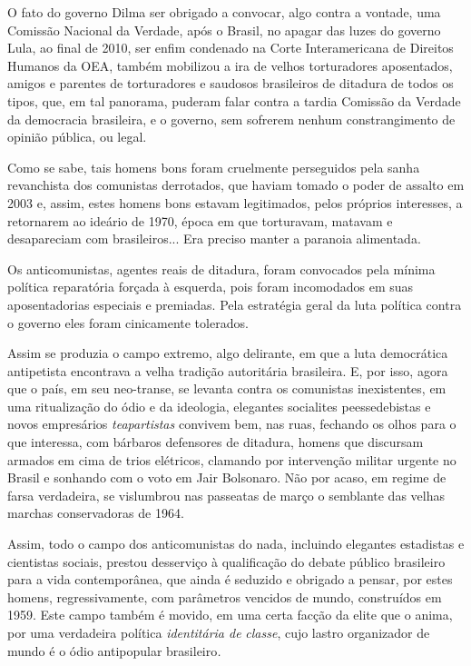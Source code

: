 O fato do governo Dilma ser obrigado a convocar, algo contra a vontade,
uma Comissão Nacional da Verdade, após o Brasil, no apagar das luzes do
governo Lula, ao final de 2010, ser enfim condenado na Corte
Interamericana de Direitos Humanos da OEA, também mobilizou a ira de
velhos torturadores aposentados, amigos e parentes de torturadores e
saudosos brasileiros de ditadura de todos os tipos, que, em tal
panorama, puderam falar contra a tardia Comissão da Verdade da
democracia brasileira, e o governo, sem sofrerem nenhum constrangimento
de opinião pública, ou legal.

Como se sabe, tais homens bons foram cruelmente perseguidos pela sanha
revanchista dos comunistas derrotados, que haviam tomado o poder de
assalto em 2003 e, assim, estes homens bons estavam legitimados, pelos
próprios interesses, a retornarem ao ideário de 1970, época em que
torturavam, matavam e desapareciam com brasileiros... Era preciso manter
a paranoia alimentada.

Os anticomunistas, agentes reais de ditadura, foram convocados pela
mínima política reparatória forçada à esquerda, pois foram incomodados
em suas aposentadorias especiais e premiadas. Pela estratégia geral da
luta política contra o governo eles foram cinicamente tolerados.

Assim se produzia o campo extremo, algo delirante, em que a luta
democrática antipetista encontrava a velha tradição autoritária
brasileira. E, por isso, agora que o país, em seu neo-transe, se levanta
contra os comunistas inexistentes, em uma ritualização do ódio e da
ideologia, elegantes socialites peessedebistas e novos empresários
\emph{teapartistas} convivem bem, nas ruas, fechando os olhos para o que
interessa, com bárbaros defensores de ditadura, homens que discursam
armados em cima de trios elétricos, clamando por intervenção militar
urgente no Brasil e sonhando com o voto em Jair Bolsonaro. Não por
acaso, em regime de farsa verdadeira, se vislumbrou nas passeatas de
março o semblante das velhas marchas conservadoras de 1964.

Assim, todo o campo dos anticomunistas do nada, incluindo elegantes
estadistas e cientistas sociais, prestou desserviço à qualificação do
debate público brasileiro para a vida contemporânea, que ainda é
seduzido e obrigado a pensar, por estes homens, regressivamente, com
parâmetros vencidos de mundo, construídos em 1959. Este campo também é
movido, em uma certa facção da elite que o anima, por uma verdadeira
política \emph{identitária de} \emph{classe}, cujo lastro organizador de
mundo é o ódio antipopular brasileiro\emph{. }

